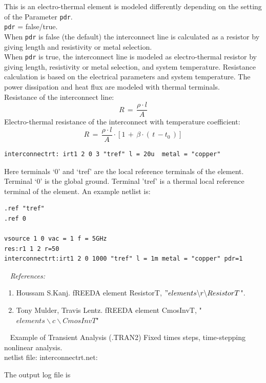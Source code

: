 \documentclass{article}
\begin{document}
\noindent This is an electro-thermal element  is modeled differently depending on the setting of the Parameter \texttt{pdr}.\\[0.2in]
\texttt{pdr} = false/true.\\[0.1in]
 When  \texttt{pdr} is false (the default) the interconnect line is calculated as a resistor by giving length and resistivity or metal selection.\\
 When  \texttt{pdr} is true, the interconnect line is modeled as electro-thermal resistor by giving length, resistivity or metal selection, and system temperature. Resistance calculation is based on the electrical parameters and system temperature. The power dissipation and heat flux are modeled with thermal terminals.\\[0.1in]
 \newline
 Resistance of the interconnect line:\\
 $$R\,=\, \frac{\rho \cdot l}{A}$$
\newline
Electro-thermal resistance of the interconnect with temperature coefficient:
$$R \,=\, \frac{\rho \cdot l}{A}  \cdot \left[  1\, + \, \beta \cdot  (\, t\, - t_0\,) \right] $$
\begin{verbatim}
interconnectrt: irt1 2 0 3 "tref" l = 20u  metal = "copper"
\end{verbatim}
Here terminals `0' and `tref' are the local reference terminals of the element. Terminal `0' is the global ground.  Terminal 'tref' is a thermal local reference terminal of the element. An example netlist is:
\begin{verbatim}
.ref "tref"
.ref 0

vsource 1 0 vac = 1 f = 5GHz
res:r1 1 2 r=50
interconnectrt:irt1 2 0 1000 "tref" l = 1m metal = "copper" pdr=1
\end{verbatim}
~
\myThickLine
\textit{References:}\\
\begin{enumerate}
\item Houssam S.Kanj. fREEDA element ResistorT, $"elements\backslash r\backslash ResistorT$".
\item Tony Mulder, Travis Lentz. fREEDA element CmosInvT, "$elements\backslash c\backslash CmosInvT$"
\end{enumerate}
~
\myThickLine
Example of Transient Analysis (.TRAN2) Fixed times steps, time-stepping nonlinear analysis.\\
netlist file: interconnectrt.net:

The output log file is

\end{document}
